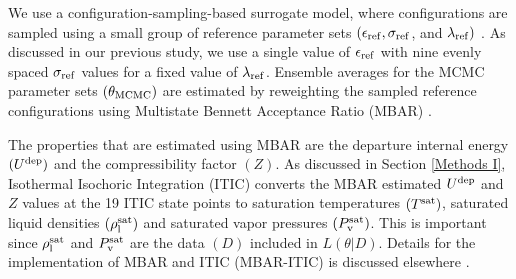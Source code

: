 \documentclass[journal=jctc,manuscript=article]{achemso}
\begin{document}
We use a configuration-sampling-based surrogate model, where configurations are sampled using a small group of reference parameter sets $(\epsilon_{\rm ref}, \sigma_{\rm ref}$, and $\lambda_{\rm ref})$ \cite{Postdoc_1}. As discussed in our previous study, we use a single value of $\epsilon_{\rm ref}$ with nine evenly spaced $\sigma_{\rm ref}$ values for a fixed value of $\lambda_{\rm ref}$. Ensemble averages for the MCMC parameter sets $(\theta_{\rm MCMC})$ are estimated by reweighting the sampled reference configurations using Multistate Bennett Acceptance Ratio (MBAR) \cite{shirts-chodera:jcp:2008:mbar}. 

The properties that are estimated using MBAR are the departure internal energy $(U^{\rm dep})$ and the compressibility factor $(Z)$. As discussed in Section \ref{Methods I}, Isothermal Isochoric Integration (ITIC) converts the MBAR estimated $U^{\rm dep}$ and $Z$ values at the 19 ITIC state points to saturation temperatures $(T^{\rm sat})$, saturated liquid densities $(\rho_{\rm l}^{\rm sat})$ and saturated vapor pressures $(P_{\rm v}^{\rm sat})$. This is important since $\rho_{\rm l}^{\rm sat}$ and $P_{\rm v}^{\rm sat}$ are the data $(D)$ included in $L(\theta|D)$. Details for the implementation of MBAR and ITIC (MBAR-ITIC) is discussed elsewhere \cite{Postdoc_1}. 
\end{document}
